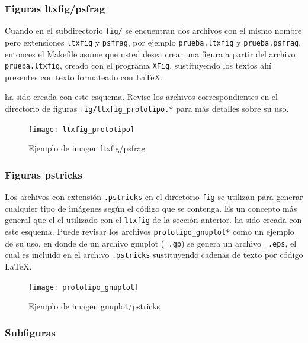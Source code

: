 \subsubsection{Figuras ltxfig/psfrag}

Cuando en el subdirectorio \texttt{fig/} se encuentran dos archivos con el
mismo nombre pero extensiones \texttt{ltxfig} y \texttt{psfrag}, por ejemplo
\texttt{prueba.ltxfig} y \texttt{prueba.psfrag}, entonces el Makefile asume que
usted desea crear una figura a partir del archivo \texttt{prueba.ltxfig},
creado con el programa \texttt{XFig}, sustituyendo los textos ahí presentes con
texto formateado con LaTeX.

 ha sido creada con este esquema.  Revise los
archivos correspondientes en el directorio de figuras
\texttt{fig/ltxfig\_prototipo.*} para más detalles sobre su uso.

\begin{figure}[htb]
  \centering
  \texttt{[image: ltxfig\_prototipo]}
  \caption{Ejemplo de imagen ltxfig/psfrag}
  \label{fig:ltxfig}
\end{figure}

\subsubsection{Figuras pstricks}  

 Los archivos con extensión \texttt{.pstricks} en el
directorio \texttt{fig} se utilizan para generar cualquier tipo de
imágenes según el código que se contenga.  Es un concepto más general
que el el utilizado con el \texttt{ltxfig} de la sección anterior.
 ha sido creada con este esquema.  Puede revisar
los archivos \texttt{prototipo\_gnuplot*} como un ejemplo de su uso,
en donde de un archivo gnuplot (\texttt{\_.gp}) se genera un archivo
\texttt{\_.eps}, el cual es incluido en el archivo \texttt{.pstricks}
sustituyendo cadenas de texto por código LaTeX.

\begin{figure}[htb]
  \centering
  \texttt{[image: prototipo\_gnuplot]}
  \caption{Ejemplo de imagen gnuplot/pstricks}
  \label{fig:pstricks}
\end{figure}

\subsubsection{Subfiguras}

